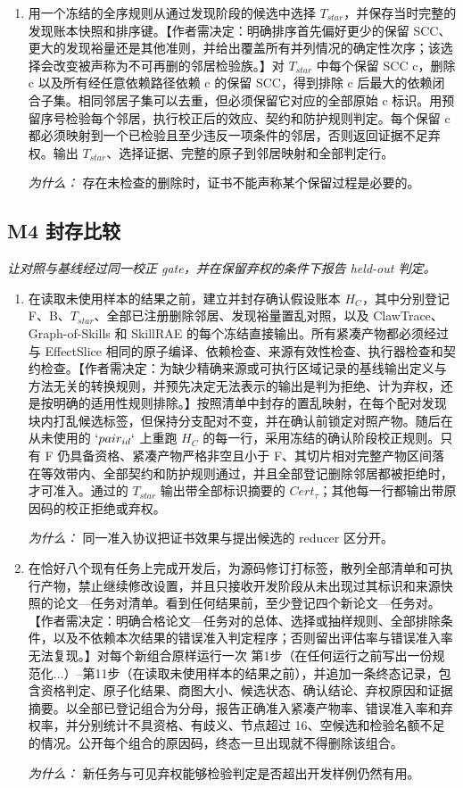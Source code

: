 \documentclass[10pt,a4paper]{article}
\begin{document}
\begin{enumerate}[leftmargin=*,start=8]
\par\emph{为什么：} 选择依据是相对 F 的下游效应差，而不是内部紧凑度代理。
  \item 用一个冻结的全序规则从通过发现阶段的候选中选择 \(T_{star}\)，并保存当时完整的发现账本快照和排序键。【作者需决定：明确排序首先偏好更少的保留 SCC、更大的发现裕量还是其他准则，并给出覆盖所有并列情况的确定性次序；该选择会改变被声称为不可再删的邻居检验族。】对 \(T_{star}\) 中每个保留 SCC c，删除 c 以及所有经任意依赖路径依赖 c 的保留 SCC，得到排除 c 后最大的依赖闭合子集。相同邻居子集可以去重，但必须保留它对应的全部原始 c 标识。用预留序号检验每个邻居，执行校正后的效应、契约和防护规则判定。每个保留 c 都必须映射到一个已检验且至少违反一项条件的邻居，否则返回证据不足弃权。输出 \(T_{star}\)、选择证据、完整的原子到邻居映射和全部判定行。
\par\emph{为什么：} 存在未检查的删除时，证书不能声称某个保留过程是必要的。
\end{enumerate}
\subsection*{M4 封存比较}
\emph{让对照与基线经过同一校正 gate，并在保留弃权的条件下报告 held-out 判定。}
\begin{enumerate}[leftmargin=*,start=11]
  \item 在读取未使用样本的结果之前，建立并封存确认假设账本 \(H_{C}\)，其中分别登记 F、B、\(T_{star}\)、全部已注册删除邻居、发现裕量置乱对照，以及 ClawTrace、Graph-of-Skills 和 SkillRAE 的每个冻结直接输出。所有紧凑产物都必须经过与 EffectSlice 相同的原子编译、依赖检查、来源有效性检查、执行器检查和契约检查。【作者需决定：为缺少精确来源或可执行区域记录的基线输出定义与方法无关的转换规则，并预先决定无法表示的输出是判为拒绝、计为弃权，还是按明确的适用性规则排除。】按照清单中封存的置乱映射，在每个配对发现块内打乱候选标签，但保持分支配对不变，并在确认前锁定对照产物。随后在从未使用的 \(`pair_{id}`\) 上重跑 \(H_{C}\) 的每一行，采用冻结的确认阶段校正规则。只有 F 仍具备资格、紧凑产物严格非空且小于 F、其切片相对完整产物区间落在等效带内、全部契约和防护规则通过，并且全部登记删除邻居都被拒绝时，才可准入。通过的 \(T_{star}\) 输出带全部标识摘要的 \(Cert_\tau \)；其他每一行都输出带原因码的校正拒绝或弃权。
\par\emph{为什么：} 同一准入协议把证书效果与提出候选的 reducer 区分开。
  \item 在恰好八个现有任务上完成开发后，为源码修订打标签，散列全部清单和可执行产物，禁止继续修改设置，并且只接收开发阶段从未出现过其标识和来源快照的论文---任务对清单。看到任何结果前，至少登记四个新论文---任务对。【作者需决定：明确合格论文---任务对的总体、选择或抽样规则、全部排除条件，以及不依赖本次结果的错误准入判定程序；否则留出评估率与错误准入率无法复现。】对每个新组合原样运行一次 第1步（在任何运行之前写出一份规范化\(\dots \)）--第11步（在读取未使用样本的结果之前），并追加一条终态记录，包含资格判定、原子化结果、商图大小、候选状态、确认结论、弃权原因和证据摘要。以全部已登记组合为分母，报告正确准入紧凑产物率、错误准入率和弃权率，并分别统计不具资格、有歧义、节点超过 16、空候选和检验名额不足的情况。公开每个组合的原因码，终态一旦出现就不得删除该组合。
\par\emph{为什么：} 新任务与可见弃权能够检验判定是否超出开发样例仍然有用。
\end{enumerate}
\end{document}

